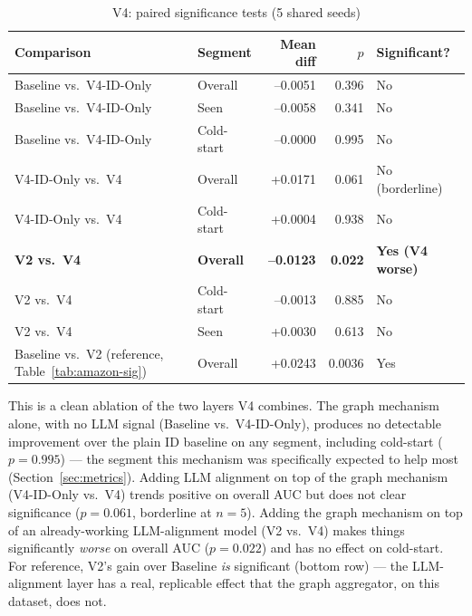 \documentclass{uclthesis}
\begin{document}
\begin{table}[h]
\centering
\caption{V4: paired significance tests (5 shared seeds)}
\label{tab:v4-sig}
\begin{tabular}{llrrl}
\toprule
Comparison & Segment & Mean diff & $p$ & Significant? \\
\midrule
Baseline vs.\ V4-ID-Only & Overall & --0.0051 & 0.396 & No \\
Baseline vs.\ V4-ID-Only & Seen & --0.0058 & 0.341 & No \\
Baseline vs.\ V4-ID-Only & Cold-start & --0.0000 & 0.995 & No \\
V4-ID-Only vs.\ V4 & Overall & +0.0171 & 0.061 & No (borderline) \\
V4-ID-Only vs.\ V4 & Cold-start & +0.0004 & 0.938 & No \\
\textbf{V2 vs.\ V4} & \textbf{Overall} & \textbf{--0.0123} & \textbf{0.022} & \textbf{Yes (V4 worse)} \\
V2 vs.\ V4 & Cold-start & --0.0013 & 0.885 & No \\
V2 vs.\ V4 & Seen & +0.0030 & 0.613 & No \\
Baseline vs.\ V2 (reference, Table~\ref{tab:amazon-sig}) & Overall & +0.0243 & 0.0036 & Yes \\
\bottomrule
\end{tabular}
\end{table}

This is a clean ablation of the two layers V4 combines. The graph mechanism alone, with no LLM signal (Baseline vs.\ V4-ID-Only), produces no detectable improvement over the plain ID baseline on any segment, including cold-start ($p=0.995$) --- the segment this mechanism was specifically expected to help most (Section~\ref{sec:metrics}). Adding LLM alignment on top of the graph mechanism (V4-ID-Only vs.\ V4) trends positive on overall AUC but does not clear significance ($p=0.061$, borderline at $n=5$). Adding the graph mechanism on top of an already-working LLM-alignment model (V2 vs.\ V4) makes things significantly \emph{worse} on overall AUC ($p=0.022$) and has no effect on cold-start. For reference, V2's gain over Baseline \emph{is} significant (bottom row) --- the LLM-alignment layer has a real, replicable effect that the graph aggregator, on this dataset, does not.
\end{document}
